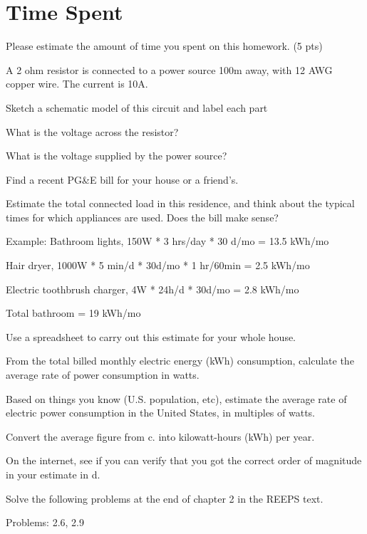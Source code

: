 \documentclass{article}
\begin{document}

\section{Time Spent}

Please estimate the amount of time you spent on this homework. (5 pts)


A 2 ohm resistor is connected to a power source 100m away, with 12 AWG copper
wire. The current is 10A.

\subproblem
Sketch a schematic model of this circuit and label each part

\subproblem
What is the voltage across the resistor?

\subproblem
What is the voltage supplied by the power source?


Find a recent PG\&E bill for your house or a friend's.

\subproblem
Estimate the total connected load in this residence, and think
about the typical times for which appliances are used.  Does the
bill make sense?

Example: Bathroom lights, 150W * 3 hrs/day * 30 d/mo = 13.5 kWh/mo

Hair dryer, 1000W * 5 min/d * 30d/mo * 1 hr/60min = 2.5 kWh/mo

Electric toothbrush charger, 4W * 24h/d * 30d/mo = 2.8 kWh/mo

Total bathroom = 19 kWh/mo

Use a spreadsheet to carry out this estimate for your whole house.

\subproblem
From the total billed monthly electric energy (kWh) consumption,
calculate the average rate of power consumption in watts.

\subproblem
Based on things you know (U.S. population, etc), estimate the
average rate of electric power consumption in the United States, in
multiples of watts.

\subproblem
Convert the average figure from c. into kilowatt-hours (kWh) per year.

\subproblem
On the internet, see if you can verify that you got the correct
order of magnitude in your estimate in d.



Solve the following problems at the end of chapter 2 in the REEPS text.

Problems:  2.6, 2.9
\end{document}
